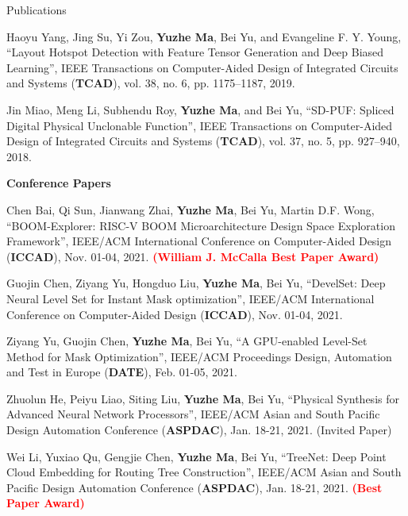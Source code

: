 \begin{rSection}{Publications}
\begin{description}[font=\normalfont]
\item[{[J2]}]{
	Haoyu Yang, Jing Su, Yi Zou, \textbf{Yuzhe Ma}, Bei Yu, and Evangeline F. Y. Young,
	``Layout Hotspot Detection with Feature Tensor Generation and Deep Biased Learning'',
	IEEE Transactions on Computer-Aided Design of Integrated Circuits and Systems (\textbf{TCAD}), vol. 38, no. 6, pp. 1175--1187, 2019.
}

\item[{[J1]}]{
	Jin Miao, Meng Li, Subhendu Roy, \textbf{Yuzhe Ma}, and Bei Yu,
	``SD-PUF: Spliced Digital Physical Unclonable Function'',
	IEEE Transactions on Computer-Aided Design of Integrated Circuits and Systems (\textbf{TCAD}), vol. 37, no. 5, pp. 927--940, 2018.
}
\end{description}


\textbf{Conference Papers}
\begin{description}[font=\normalfont]
\item [{[C24]}]{
    Chen Bai, Qi Sun, Jianwang Zhai, \textbf{Yuzhe Ma}, Bei Yu, Martin D.F. Wong,
    ``BOOM-Explorer: RISC-V BOOM Microarchitecture Design Space Exploration Framework'',
    IEEE/ACM International Conference on Computer-Aided Design (\textbf{ICCAD}), Nov. 01-04, 2021.
    \textcolor{red}{\textbf{(William J. McCalla Best Paper Award)}}
}


\item [{[C23]}]{
    Guojin Chen, Ziyang Yu, Hongduo Liu, \textbf{Yuzhe Ma}, Bei Yu,
    ``DevelSet: Deep Neural Level Set for Instant Mask optimization'',
    IEEE/ACM International Conference on Computer-Aided Design (\textbf{ICCAD}), Nov. 01-04, 2021.
}

\item [{[C22]}]{
        Ziyang Yu, Guojin Chen, \textbf{Yuzhe Ma}, Bei Yu,
        ``A GPU-enabled Level-Set Method for Mask Optimization'',
        IEEE/ACM Proceedings Design, Automation and Test in Europe (\textbf{DATE}), Feb. 01-05, 2021.
    }

\item [{[C21]}]{
        Zhuolun He, Peiyu Liao, Siting Liu, \textbf{Yuzhe Ma}, Bei Yu,
        ``Physical Synthesis for Advanced Neural Network Processors'',
         IEEE/ACM Asian and South Pacific Design Automation Conference (\textbf{ASPDAC}), Jan. 18-21, 2021. (Invited Paper)
    }

\item [{[C20]}]{
        Wei Li, Yuxiao Qu, Gengjie Chen, \textbf{Yuzhe Ma}, Bei Yu,
        ``TreeNet: Deep Point Cloud Embedding for Routing Tree Construction'',
         IEEE/ACM Asian and South Pacific Design Automation Conference (\textbf{ASPDAC}), Jan. 18-21, 2021.
        \textcolor{red}{\textbf{(Best Paper Award)}}
    }


\end{description}
\end{rSection}
